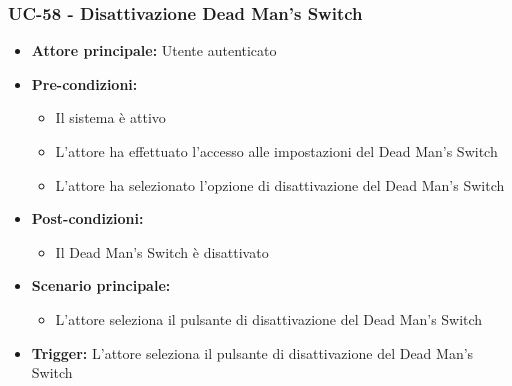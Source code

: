 \documentclass[a4paper,12pt]{article}
\begin{document}
\subsubsection{UC-58 - Disattivazione Dead Man's Switch} \label{sec:UC-58}
\begin{itemize}
    \item \textbf{Attore principale:} Utente autenticato
    \item \textbf{Pre-condizioni:}
    \begin{itemize}
        \item Il sistema è attivo
        \item L'attore ha effettuato l'accesso alle impostazioni del Dead Man's Switch
        \item L'attore ha selezionato l'opzione di disattivazione del Dead Man's Switch
    \end{itemize}
    \item \textbf{Post-condizioni:}
    \begin{itemize}
        \item Il Dead Man's Switch è disattivato
    \end{itemize}
    \item \textbf{Scenario principale:} 
    \begin{itemize}
        \item L'attore seleziona il pulsante di disattivazione del Dead Man's Switch
    \end{itemize}
    \item \textbf{Trigger:} L'attore seleziona il pulsante di disattivazione del Dead Man's Switch
\end{itemize}

\end{document}

